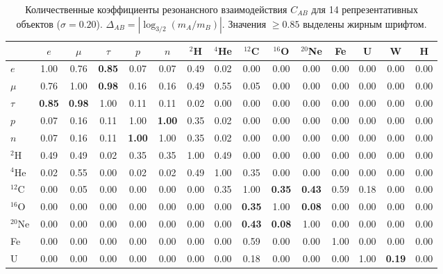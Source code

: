 \documentclass[11pt,a4paper]{article}
\begin{document}
	\begin{table}[H]
		\centering
		\caption{Количественные коэффициенты резонансного взаимодействия \(C_{AB}\) для 14 репрезентативных объектов (\(\sigma = 0.20\)). \(\Delta_{AB} = |\log_{3/2}(m_A/m_B)|\). Значения \(\ge 0.85\) выделены жирным шрифтом.}
		\label{tab:CAB}
		\scriptsize
		\begin{tabular}{l c c c c c c c c c c c c c c}
			\toprule
			& \(e\) & \(\mu\) & \(\tau\) & \(p\) & \(n\) & \(^2\)H & \(^4\)He & \(^{12}\)C & \(^{16}\)O & \(^{20}\)Ne & Fe & U & W & H \\
			\midrule
			\(e\) & 1.00 & 0.76 & \textbf{0.85} & 0.07 & 0.07 & 0.49 & 0.02 & 0.00 & 0.00 & 0.00 & 0.00 & 0.00 & 0.00 & 0.00 \\
			\(\mu\) & 0.76 & 1.00 & \textbf{0.98} & 0.16 & 0.16 & 0.49 & 0.55 & 0.05 & 0.00 & 0.00 & 0.00 & 0.00 & 0.00 & 0.00 \\
			\(\tau\) & \textbf{0.85} & \textbf{0.98} & 1.00 & 0.11 & 0.11 & 0.02 & 0.00 & 0.00 & 0.00 & 0.00 & 0.00 & 0.00 & 0.00 & 0.00 \\
			\(p\) & 0.07 & 0.16 & 0.11 & 1.00 & \textbf{1.00} & 0.35 & 0.02 & 0.00 & 0.00 & 0.00 & 0.00 & 0.00 & 0.00 & 0.00 \\
			\(n\) & 0.07 & 0.16 & 0.11 & \textbf{1.00} & 1.00 & 0.35 & 0.02 & 0.00 & 0.00 & 0.00 & 0.00 & 0.00 & 0.00 & 0.00 \\
			\(^2\)H & 0.49 & 0.49 & 0.02 & 0.35 & 0.35 & 1.00 & 0.49 & 0.00 & 0.00 & 0.00 & 0.00 & 0.00 & 0.00 & 0.00 \\
			\(^4\)He & 0.02 & 0.55 & 0.00 & 0.02 & 0.02 & 0.49 & 1.00 & 0.35 & 0.00 & 0.00 & 0.00 & 0.00 & 0.00 & 0.00 \\
			\(^{12}\)C & 0.00 & 0.05 & 0.00 & 0.00 & 0.00 & 0.00 & 0.35 & 1.00 & \textbf{0.35} & \textbf{0.43} & 0.59 & 0.18 & 0.00 & 0.00 \\
			\(^{16}\)O & 0.00 & 0.00 & 0.00 & 0.00 & 0.00 & 0.00 & 0.00 & \textbf{0.35} & 1.00 & \textbf{0.08} & 0.00 & 0.00 & 0.00 & 0.00 \\
			\(^{20}\)Ne & 0.00 & 0.00 & 0.00 & 0.00 & 0.00 & 0.00 & 0.00 & \textbf{0.43} & \textbf{0.08} & 1.00 & 0.00 & 0.00 & 0.00 & 0.00 \\
			Fe & 0.00 & 0.00 & 0.00 & 0.00 & 0.00 & 0.00 & 0.00 & 0.59 & 0.00 & 0.00 & 1.00 & 0.00 & 0.00 & 0.00 \\
			U & 0.00 & 0.00 & 0.00 & 0.00 & 0.00 & 0.00 & 0.00 & 0.18 & 0.00 & 0.00 & 0.00 & 1.00 & \textbf{0.19} & 0.00 \\

\end{tabular}
\end{table}
\end{document}

